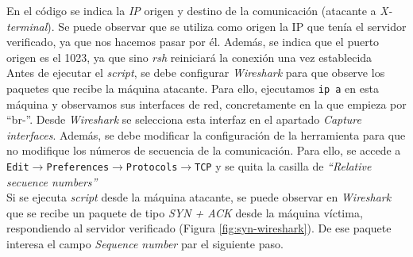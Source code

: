 \documentclass{article}
\begin{document}
En el código se indica la \textit{IP} origen y destino de la comunicación (atacante a \textit{X-terminal}). Se puede observar que se utiliza como origen la IP que tenía el servidor verificado, ya que nos hacemos pasar por él. Además, se indica que el puerto origen es el 1023, ya que sino \textit{rsh} reiniciará la conexión una vez establecida\\
Antes de ejecutar el \textit{script}, se debe configurar \textit{Wireshark} para que observe los paquetes que recibe la máquina atacante. Para ello, ejecutamos \texttt{ip a} en esta máquina y observamos sus interfaces de red, concretamente en la que empieza por ``br-''. Desde \textit{Wireshark} se selecciona esta interfaz en el apartado \textit{Capture interfaces}. Además, se debe modificar la configuración de la herramienta para que no modifique los números de secuencia de la comunicación. Para ello, se accede a \texttt{Edit$\rightarrow$Preferences$\rightarrow$Protocols$\rightarrow$TCP} y se quita la casilla de \textit{``Relative secuence numbers''} \\

Si se ejecuta \textit{script} desde la máquina atacante, se puede observar en \textit{Wireshark} que se recibe un paquete de tipo \textit{SYN + ACK} desde la máquina víctima, respondiendo al servidor verificado (Figura \ref{fig:syn-wireshark}). De ese paquete interesa el campo \textit{Sequence number} par el siguiente paso. 
\end{document}
